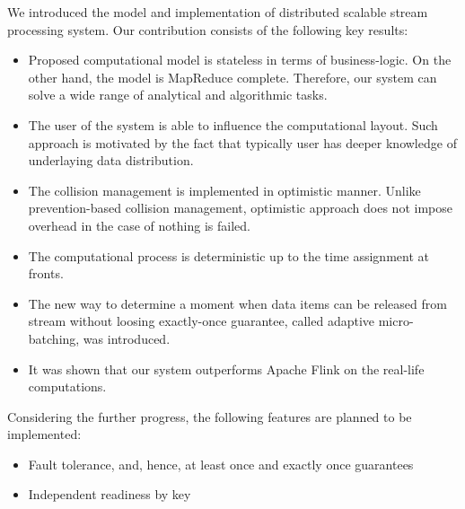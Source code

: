 
\label {fs-conclusions}

We introduced the model and implementation of distributed scalable stream processing system. Our contribution consists of the following key results:

\begin{itemize}
    \item Proposed computational model is stateless in terms of business-logic. On the other hand, the model is MapReduce complete. Therefore, our system can solve a wide range of analytical and algorithmic tasks.
    \item The user of the system is able to influence the computational layout. Such approach is motivated by the fact that typically user has deeper knowledge of underlaying data distribution.
    \item The collision management is implemented in optimistic manner. Unlike prevention-based collision management, optimistic approach does not impose overhead in the case of nothing is failed.
    \item The computational process is deterministic up to the time assignment at fronts.
    \item The new way to determine a moment when data items can be released from stream without loosing exactly-once guarantee, called adaptive micro-batching, was introduced.  
    \item It was shown that our system outperforms Apache Flink on the real-life computations.   
\end{itemize}

Considering the further progress, the following features are planned to be implemented:
\begin{itemize}
    \item Fault tolerance, and, hence, at least once and exactly once guarantees
    \item Independent readiness by key
\end{itemize}










